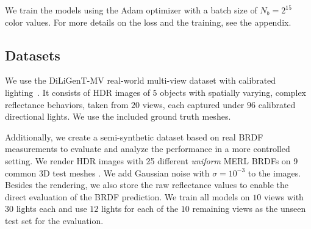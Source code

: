 We train the models using the Adam optimizer \cite{Kingma14Adam} with a batch size of $N_{b}=2^{15}$ color values. For more details on the loss and the training, see the appendix.

\subsection{Datasets}
\label{sec:datasets}
We use the DiLiGenT-MV real-world multi-view dataset with calibrated lighting~\cite{Li2020DiLiGentMVDataset}. It consists of HDR images of $5$ objects with spatially varying, complex reflectance behaviors, taken from $20$ views, each captured under $96$ calibrated directional lights. We use the included ground truth meshes. %

Additionally, we create a semi-synthetic dataset based on real BRDF measurements to evaluate and analyze the performance in a more controlled setting. We render HDR images with 25 different \emph{uniform} MERL BRDFs \cite{matusik2003MERL} on 9 common 3D test meshes \cite{jacobson2020common}.
We add Gaussian noise with 
$\sigma = 10^{-3}$ to the images.
Besides the rendering, we also store the raw 
reflectance values to enable the direct evaluation of the BRDF prediction.
We train all models on $10$ views with $30$ lights each and use $12$ lights for each of the $10$ remaining views as the unseen test set for the evaluation.

